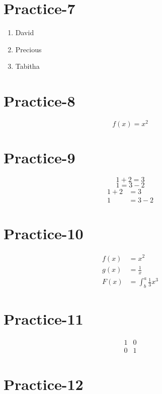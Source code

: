 \documentclass{article}
\begin{document}
\section{Practice-7}
\begin{enumerate}
	\item David
	\item Precious
	\item Tabitha
\end{enumerate}
\section{Practice-8}
	\begin{equation*}
	f(x)=x^2
\end{equation*}
\section{Practice-9}
	\begin{equation*}
	1 + 2 = 3
\end{equation*}
\begin{equation*}
	1 = 3 - 2
\end{equation*}
\begin{align*}
	1 + 2 &= 3\\
	1 &= 3 - 2
\end{align*}
\section{Practice-10}
	\begin{align*}
	f(x) &= x^2\\
	g(x) &= \frac{1}{x}\\
	F(x) &= \int^a_b
	\frac{1}{3}x^3
\end{align*}

\section{Practice-11}
	\begin{equation}
	\begin{matrix}
		1 & 0\\ 0 & 1
	\end{matrix}
\end{equation}
\section{Practice-12}
\begin{equation}
	[
	\begin{matrix}
		1 & 0\\
		0 & 1
	\end{matrix}
	]
\end{equation}
\end{document}
